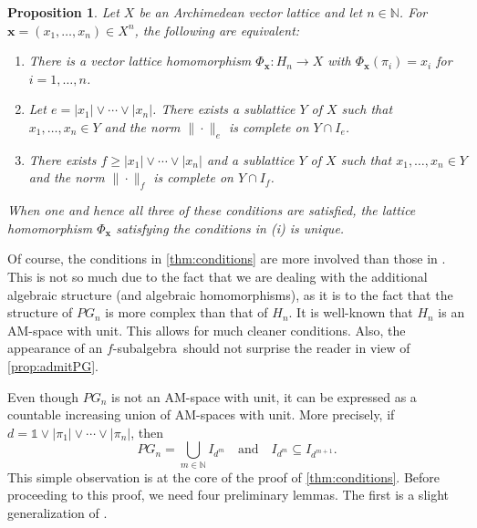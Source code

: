 \documentclass{amsart}
\theoremstyle{plain}
\newtheorem{prop}[thm]{Proposition}
\theoremstyle{definition}
\theoremstyle{remark}
\newcommand\N{\ensuremath{\mathbb{N}}}
\newcommand{\one}{\mathbb{1}}
\newcommand{\fsubalg}{$f\!$-subalgebra}
\newcommand{\Phx}{\Phi_{\bm x}}
\begin{document}
\begin{prop}
    Let $X$ be an Archimedean vector lattice and let $n \in \N$. For
    $\bm x=(x_1,\ldots ,x_n) \in X^{n}$, the following are equivalent:
    \begin{enumerate}
        \item There is a vector lattice homomorphism $\Phx\colon
            H_n\to X$ with $\Phx(\pi _i)=x_i$ for $i=1,\ldots ,n$.
        \item Let $e=|x_1|\vee \cdots \vee |x_n|$. There exists a
            sublattice $Y$ of $X$ such that $x_1,\ldots ,x_n \in Y$
            and the norm $\|{\cdot
            }\|_e$ is complete on $Y\cap I_e$.
        \item There exists $f\ge |x_1|\vee \cdots
            \vee |x_n|$ and a sublattice $Y$ of $X$ such that
            $x_1,\ldots ,x_n \in Y$ and the norm
            $\|{\cdot }\|_f$ is complete on $Y\cap I_f$.
    \end{enumerate}
    When one and hence all three of these conditions are satisfied,
    the lattice homomorphism $\Phx$ satisfying the conditions
    in \textit{(i)} is unique.
\end{prop}

Of course, the conditions in \cref{thm:conditions} are more involved
than those in \cite[Proposition 2.2]{laustsen_troitsky2020}. This is
not so much due to the fact that we are dealing with the additional
algebraic structure (and algebraic homomorphisms), as it is to the
fact that the structure of $PG_n$ is more complex than that of $H_n$.
It is well-known that $H_n$ is an AM-space with unit. This allows for
much cleaner conditions. Also, the appearance of an \fsubalg\ should
not surprise the reader in view of \cref{prop:admitPG}.

Even though $PG_n$ is not an AM-space with unit, it can be expressed
as a countable increasing union of AM-spaces with unit.
More precisely, if $d=\one\vee |\pi _1|\vee \cdots \vee |\pi _n|$, then
\begin{equation*}
PG_n=\bigcup_{m \in \N} I_{d^{m}}\quad\text{and}\quad I_{d^{m}}\subseteq
I_{d^{m+1}}.
\end{equation*}
This simple observation is at the core of the proof of
\cref{thm:conditions}. Before proceeding to this proof, we need four
preliminary lemmas. The first is a slight generalization of
\cite[Lemma 2.1]{laustsen_troitsky2020}.
\end{document}
